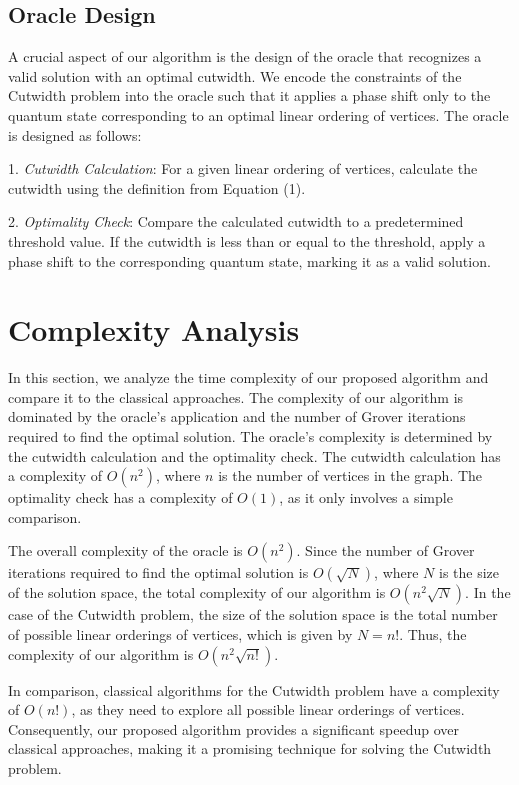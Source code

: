 \subsection{Oracle Design}

A crucial aspect of our algorithm is the design of the oracle that recognizes a valid solution with an optimal cutwidth. We encode the constraints of the Cutwidth problem into the oracle such that it applies a phase shift only to the quantum state corresponding to an optimal linear ordering of vertices. The oracle is designed as follows:

1. \textit{Cutwidth Calculation}: For a given linear ordering of vertices, calculate the cutwidth using the definition from Equation (1).

2. \textit{Optimality Check}: Compare the calculated cutwidth to a predetermined threshold value. If the cutwidth is less than or equal to the threshold, apply a phase shift to the corresponding quantum state, marking it as a valid solution.

\section{Complexity Analysis}
\label{sec:complexity}

In this section, we analyze the time complexity of our proposed algorithm and compare it to the classical approaches. The complexity of our algorithm is dominated by the oracle's application and the number of Grover iterations required to find the optimal solution. The oracle's complexity is determined by the cutwidth calculation and the optimality check. The cutwidth calculation has a complexity of $O(n^2)$, where $n$ is the number of vertices in the graph. The optimality check has a complexity of $O(1)$, as it only involves a simple comparison.

The overall complexity of the oracle is $O(n^2)$. Since the number of Grover iterations required to find the optimal solution is $O(\sqrt{N})$, where $N$ is the size of the solution space, the total complexity of our algorithm is $O(n^2\sqrt{N})$. In the case of the Cutwidth problem, the size of the solution space is the total number of possible linear orderings of vertices, which is given by $N = n!$. Thus, the complexity of our algorithm is $O(n^2\sqrt{n!})$.

In comparison, classical algorithms for the Cutwidth problem have a complexity of $O(n!)$, as they need to explore all possible linear orderings of vertices. Consequently, our proposed algorithm provides a significant speedup over classical approaches, making it a promising technique for solving the Cutwidth problem.

